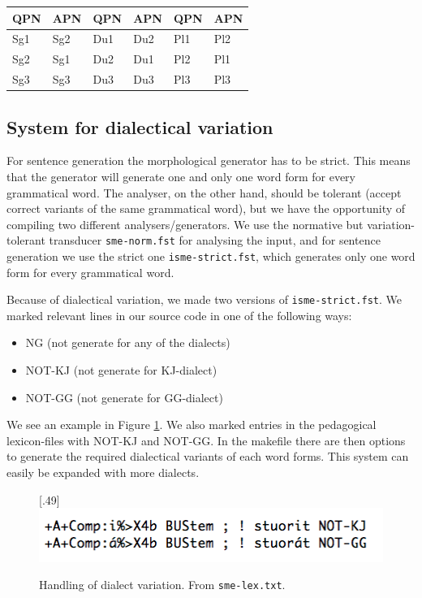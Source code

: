 \documentclass[11pt]{article}
\begin{document}
\begin{tabular}[t]{ll|ll|ll}
QPN &APN &QPN &APN &QPN &APN \\
\hline
Sg1 &Sg2 &Du1 &Du2 &Pl1 &Pl2 \\
Sg2 &Sg1 &Du2 &Du1 &Pl2 &Pl1 \\
Sg3 &Sg3 &Du3 &Du3 &Pl3 &Pl3 \\
\hline
\end{tabular}


\subsection{System for dialectical variation}\label{dialect}
For sentence generation the morphological generator has to be strict. This means that the generator will generate one and only one word form for every grammatical word. The analyser, on the other hand, should be tolerant (accept correct variants of the same grammatical word), but we have the opportunity of compiling two different analysers/generators. We use the normative but variation-tolerant transducer \texttt{sme-norm.fst} for analysing the input, and for sentence generation we use the strict one \texttt{isme-strict.fst}, which generates only one word form for every grammatical word.

Because of dialectical variation, we made two versions of \texttt{isme-strict.fst}. We marked relevant lines in our source code in one of the following ways:
\begin {itemize}
\item NG (not generate for any of the dialects)
\item NOT-KJ (not generate for KJ-dialect) 
\item NOT-GG (not generate for GG-dialect)  
\end {itemize}

We see an example in Figure \ref{smelex}. We also marked entries in the pedagogical lexicon-files with NOT-KJ and NOT-GG. In the makefile there are then options to generate the required dialectical variants of each word forms. This system can easily be expanded with more dialects.


\begin{figure}[htbp]
\begin{center}
\scalebox{.49}[.49]{\includegraphics{presentation/img/smelex2.png}}\\
\caption{Handling of dialect variation. From \texttt{sme-lex.txt}.}
\label{smelex}
\end{center}
\end{figure}
\end{document}
